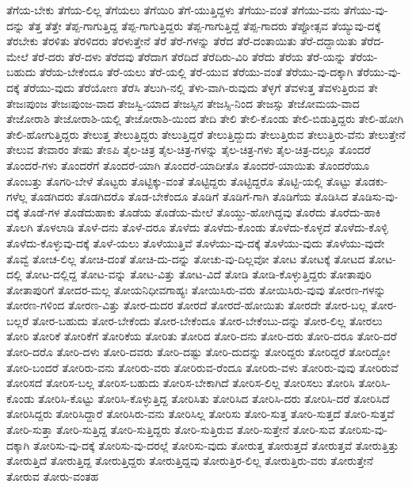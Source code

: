 {ತೆಗೆಯ-ಬೇಕು
ತೆಗೆಯ-ಲಿಲ್ಲ
ತೆಗೆಯಲು
ತೆಗೆಯಿರಿ
ತೆಗೆ-ಯುತ್ತಿದ್ದಳು
ತೆಗೆಯು-ವಂತೆ
ತೆಗೆಯು-ವನು
ತೆಗೆಯು-ವು-ದನ್ನು
ತೆತ್ತ
ತೆತ್ತೇ
ತೆಪ್ಪ-ಗಾಗುತ್ತಿದ್ದ
ತೆಪ್ಪ-ಗಾಗುತ್ತಿದ್ದರು
ತೆಪ್ಪ-ಗಾಗುತ್ತಿದ್ದೆ
ತೆಪ್ಪ-ಗಾದರು
ತೆಪ್ಪೋತ್ಸವ
ತೆಯ್ಯುವು-ದಕ್ಕೆ
ತೆರಬೇಕು
ತೆರಳಿತು
ತೆರಳಿದರು
ತೆರಳುತ್ತೇನೆ
ತೆರೆ
ತೆರೆ-ಗಳನ್ನು
ತೆರೆದ
ತೆರೆ-ದಂತಾಯಿತು
ತೆರೆ-ದದ್ದಾಯಿತು
ತೆರೆದ-ಮೇಲೆ
ತೆರೆ-ದರು
ತೆರೆ-ದಳು
ತೆರೆದವು
ತೆರೆದಾಗ
ತೆರೆದಿದೆ
ತೆರೆದಿರು-ವಿರಿ
ತೆರೆದು
ತೆರೆಯ
ತೆರೆ-ಯನ್ನು
ತೆರೆಯ-ಬಹುದು
ತೆರೆಯ-ಬೇಕೆಂದೂ
ತೆರೆ-ಯಲು
ತೆರೆ-ಯಲ್ಲಿ
ತೆರೆ-ಯುವ
ತೆರೆಯು-ವಂತೆ
ತೆರೆಯು-ವು-ದಕ್ಕಾಗಿ
ತೆರೆಯು-ವು-ದಕ್ಕೆ
ತೆರೆಯು-ವುದು
ತೆರೆಯೋಣ
ತೆರೆಸಿ
ತೆಲುಗಿ-ನಲ್ಲಿ
ತೆಳು-ವಾಗಿ-ರುವುದು
ತೆಳ್ಳಗೆ
ತೆವಳುತ್ತ
ತೆವಳುತ್ತಿರುವ
ತೇ
ತೇಜಃಪುಂಜ
ತೇಜಃಪುಂಜ-ವಾದ
ತೇಜಸ್ವಿ-ಯಾದ
ತೇಜಸ್ಸಿನ
ತೇಜಸ್ಸಿ-ನಿಂದ
ತೇಜಸ್ಸು
ತೇಜೋಮಯ-ವಾದ
ತೇಜೋರಾಶಿ
ತೇಜೋರಾಶಿ-ಯಲ್ಲಿ
ತೇಜೋರಾಶಿ-ಯಿಂದ
ತೇದಿ
ತೇಲಿ
ತೇಲಿ-ಕೊಂಡು
ತೇಲಿ-ಬಿಡುತ್ತಿದ್ದರು
ತೇಲಿ-ಹೋಗಿ
ತೇಲಿ-ಹೋಗುತ್ತಿದ್ದರು
ತೇಲುತ್ತ
ತೇಲುತ್ತಿದ್ದರು
ತೇಲುತ್ತಿದ್ದರೆ
ತೇಲುತ್ತಿದ್ದುದು
ತೇಲುತ್ತಿರುವ
ತೇಲುತ್ತಿರು-ವೆನು
ತೇಲುತ್ತೇನೆ
ತೇಲುವ
ತೇವಾರಂ
ತೇಷು
ತೇಽಪಿ
ತೈಲ-ಚಿತ್ರ
ತೈಲ-ಚಿತ್ರ-ಗಳನ್ನು
ತೈಲ-ಚಿತ್ರ-ಗಳು
ತೈಲ-ಚಿತ್ರ-ದಲ್ಲೂ
ತೊಂದರೆ
ತೊಂದರೆ-ಗಳು
ತೊಂದರೆಗೆ
ತೊಂದರೆ-ಯಾಗಿ
ತೊಂದರೆ-ಯಾದೀತೊ
ತೊಂದರೆ-ಯಾಯಿತು
ತೊಂದರೆಯೂ
ತೊಂಬತ್ತು
ತೊಗರಿ-ಬೇಳೆ
ತೊಟ್ಟರು
ತೊಟ್ಟಿಕ್ಕು-ವಂತೆ
ತೊಟ್ಟಿದ್ದರು
ತೊಟ್ಟಿದ್ದರೊ
ತೊಟ್ಟಿ-ಯಲ್ಲಿ
ತೊಟ್ಟು
ತೊಡಕು-ಗಳೆಲ್ಲ
ತೊಡಗಿದರು
ತೊಡಗಿದರೊ
ತೊಡ-ಬೇಕೆಂದೂ
ತೊಡಿಗೆ
ತೊಡಿಗೆ-ಗಾಗಿ
ತೊಡಿಗೆಯ
ತೊಡಿಸಿದ
ತೊಡಿಸು-ವು-ದಕ್ಕೆ
ತೊಡೆ-ಗಳ
ತೊಡೆದುಹಾಕು
ತೊಡೆಯ
ತೊಡೆಯ-ಮೇಲೆ
ತೊಯ್ದು-ಹೋಗಿದ್ದವು
ತೊರೆದು
ತೊರೆದು-ಹಾಕಿ
ತೊಲಗಿ
ತೊಳಲಾಡಿ
ತೊಳೆ-ದನು
ತೊಳೆ-ದರೂ
ತೊಳೆದು
ತೊಳೆದು-ಕೊಂಡು
ತೊಳೆದು-ಕೊಳ್ಳದೆ
ತೊಳೆದು-ಕೊಳ್ಳಿ
ತೊಳೆದು-ಕೊಳ್ಳುವು-ದಕ್ಕೆ
ತೊಳೆ-ಯಲು
ತೊಳೆಯುತ್ತಿವೆ
ತೊಳೆಯು-ವು-ದಕ್ಕೆ
ತೊಳೆಯು-ವುದು
ತೊಳೆಯು-ವುದೇ
ತೊವ್ವೆ
ತೋಚ-ಲಿಲ್ಲ
ತೋಚಿ-ದಂತೆ
ತೋಚಿ-ದು-ದನ್ನು
ತೋಚು-ವು-ದಿಲ್ಲವೋ
ತೋಟ
ತೋಟಕ್ಕೆ
ತೋಟದ
ತೋಟ-ದಲ್ಲಿ
ತೋಟ-ದಲ್ಲಿದ್ದ
ತೋಟ-ವನ್ನು
ತೋಟ-ವಿತ್ತು
ತೋಟ-ವಿದೆ
ತೋಡಿ
ತೋಡಿ-ಕೊಳ್ಳುತ್ತಿದ್ದರು
ತೋತಾಪುರಿ
ತೋತಾಪುರಿಗೆ
ತೋದರ-ಮಲ್ಲ
ತೋಯನಿಧೀವಗಾಹ್ಯಃ
ತೋಯಿಸಿರು-ವರು
ತೋಯಿಸಿರು-ವುವು
ತೋರಣ-ಗಳನ್ನು
ತೋರಣ-ಗಳಿಂದ
ತೋರಣ-ವಿತ್ತು
ತೋರ-ದುದರ
ತೋರದೆ
ತೋರದೆ-ಹೋಯಿತು
ತೋರದೇ
ತೋರ-ಬಲ್ಲ
ತೋರ-ಬಲ್ಲರೆ
ತೋರ-ಬಹುದು
ತೋರ-ಬೇಕೆಂದು
ತೋರ-ಬೇಕೆಂದೂ
ತೋರ-ಬೇಕೆಂಬು-ದನ್ನು
ತೋರ-ಲಿಲ್ಲ
ತೋರಲು
ತೋರಿ
ತೋರಿಕೆ
ತೋರಿಕೆಗೆ
ತೋರಿಕೆಯ
ತೋರಿತು
ತೋರಿದ
ತೋರಿ-ದನು
ತೋರಿ-ದರು
ತೋರಿ-ದರೂ
ತೋರಿ-ದರೆ
ತೋರಿ-ದರೊ
ತೋರಿ-ದಳು
ತೋರಿ-ದವರು
ತೋರಿ-ದಷ್ಟು
ತೋರಿ-ದುದನ್ನು
ತೋರಿದ್ದರು
ತೋರಿದ್ದರೆ
ತೋರಿದ್ದೋ
ತೋರಿ-ಬಂದರೆ
ತೋರಿರು-ವನು
ತೋರಿರು-ವರು
ತೋರಿರುವ-ರೆಂದೂ
ತೋರಿರು-ವಳು
ತೋರಿರು-ವುವು
ತೋರಿರುವೆ
ತೋರಿಸದೆ
ತೋರಿಸ-ಬಲ್ಲ
ತೋರಿಸ-ಬಹುದು
ತೋರಿಸ-ಬೇಕಾಗಿದೆ
ತೋರಿಸ-ಲಿಲ್ಲ
ತೋರಿಸಲು
ತೋರಿಸಿ
ತೋರಿಸಿ-ಕೊಂಡು
ತೋರಿಸಿ-ಕೊಟ್ಟು
ತೋರಿಸಿ-ಕೊಳ್ಳುತ್ತಿದ್ದ
ತೋರಿಸಿತು
ತೋರಿಸಿದ
ತೋರಿಸಿ-ದರು
ತೋರಿಸಿ-ದರೆ
ತೋರಿಸಿದೆ
ತೋರಿಸಿದ್ದರು
ತೋರಿಸಿದ್ದಾರೆ
ತೋರಿಸಿರು-ವನು
ತೋರಿಸಿಲ್ಲ
ತೋರಿಸು
ತೋರಿ-ಸುತ್ತ
ತೋರಿ-ಸುತ್ತದೆ
ತೋರಿ-ಸುತ್ತವೆ
ತೋರಿ-ಸುತ್ತಾ
ತೋರಿ-ಸುತ್ತಿದ್ದ
ತೋರಿ-ಸುತ್ತಿದ್ದರು
ತೋರಿ-ಸುತ್ತಿರುವ
ತೋರಿ-ಸುತ್ತೇನೆ
ತೋರಿ-ಸುವ
ತೋರಿಸು-ವು-ದಕ್ಕಾಗಿ
ತೋರಿಸು-ವು-ದಕ್ಕೆ
ತೋರಿಸು-ವು-ದರಲ್ಲೆ
ತೋರಿಸು-ವುದು
ತೋರುತ್ತ
ತೋರುತ್ತದೆ
ತೋರುತ್ತವೆ
ತೋರುತ್ತಿತ್ತು
ತೋರುತ್ತಿದೆ
ತೋರುತ್ತಿದ್ದ
ತೋರುತ್ತಿದ್ದರು
ತೋರುತ್ತಿದ್ದವು
ತೋರುತ್ತಿರ-ಲಿಲ್ಲ
ತೋರುತ್ತಿರು-ವರು
ತೋರುತ್ತೇನೆ
ತೋರುವ
ತೋರು-ವಂತಹ
}
